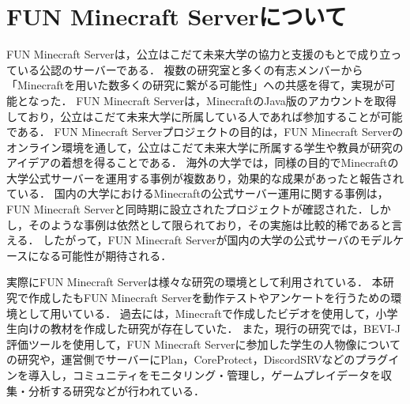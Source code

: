 \section{FUN Minecraft Serverについて}
FUN Minecraft Server\cite{bib:fun_minecraft_server}は，公立はこだて未来大学の協力と支援のもとで成り立っている公認のサーバーである．
複数の研究室と多くの有志メンバーから「Minecraftを用いた数多くの研究に繋がる可能性」への共感を得て，実現が可能となった．
FUN Minecraft Serverは，MinecraftのJava版のアカウントを取得しており，公立はこだて未来大学に所属している人であれば参加することが可能である．
FUN Minecraft Serverプロジェクトの目的は，FUN Minecraft Serverのオンライン環境を通して，公立はこだて未来大学に所属する学生や教員が研究のアイデアの着想を得ることである．
海外の大学では，同様の目的でMinecraftの大学公式サーバーを運用する事例が複数あり，効果的な成果があったと報告されている\cite{bib:cambridge_minecraft_server, bib:texas_minecraft_server}．
国内の大学におけるMinecraftの公式サーバー運用に関する事例は，FUN Minecraft Serverと同時期に設立されたプロジェクトが確認された\cite{bib:tducraft}．しかし，そのような事例は依然として限られており，その実施は比較的稀であると言える．
したがって，FUN Minecraft Serverが国内の大学の公式サーバのモデルケースになる可能性が期待される．

実際にFUN Minecraft Serverは様々な研究の環境として利用されている．
本研究で作成した{\mason}もFUN Minecraft Serverを動作テストやアンケートを行うための環境として用いている．
過去には，Minecraftで作成したビデオを使用して，小学生向けの教材を作成した研究が存在していた\cite{bib:fun_minecraft_server_research}．
また，現行の研究では，BEVI-J評価ツールを使用して，FUN Minecraft Serverに参加した学生の人物像についての研究\cite{bib:fun_minecraft_server_research}や，運営側でサーバーにPlan，CoreProtect，DiscordSRVなどのプラグインを導入し，コミュニティをモニタリング・管理し，ゲームプレイデータを収集・分析する研究などが行われている\cite{bib:fun_minecraft_server_research,bib:fun_minecraft_server_research2}．